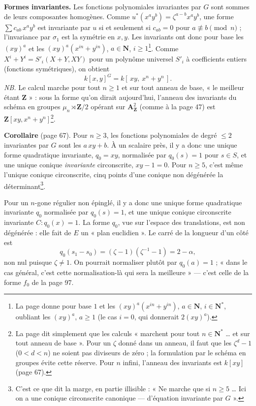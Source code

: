 \documentclass[11pt,a4paper]{article}
\begin{document}
\textbf{Formes invariantes.} Les fonctions polynomiales invariantes par $G$
sont sommes de leurs composantes homogènes. Comme $u^{*}(x^a y^b) =
\zeta^{a-b} x^a y^b$, une forme $\sum c_{ab}\, x^a y^b$ est invariante par
$u$ si et seulement si $c_{ab} = 0$ pour $a \not\equiv b \pmod n$ ;
l'invariance par $\sigma_1$ est la symétrie en $x, y$. Les invariants ont donc
pour base les $(xy)^a$ et les $(xy)^a (x^{in} + y^{in})$, $a \in \mathbf{N}$,
$i \geq 1$\footnote{La page donne pour base $1$ et les $(xy)^a(x^{in} +
y^{in})$, $a \in \mathbf{N}$, $i \in \mathbf{N}^{*}$, oubliant les $(xy)^a$,
$a \geq 1$ (le cas $i = 0$, qui donnerait $2(xy)^a$).}. Comme $X^i + Y^i =
S'_i(X + Y, XY)$ pour un polynôme universel $S'_i$ à coefficients entiers
(fonctions symétriques), on obtient
\[
  k[x, y]^{G} = k[\,xy,\ x^n + y^n\,] .
\]
\emph{NB.} Le calcul marche pour tout $n \geq 1$ et sur tout anneau de base,
« le meilleur étant $\mathbf{Z}$ » : sous la forme qu'on dirait aujourd'hui,
l'anneau des invariants du schéma en groupes $\mu_n \rtimes \mathbf{Z}/2$
opérant sur $\mathbf{A}^2_{\mathbf{Z}}$ (comme à la page 47) est
$\mathbf{Z}[xy, x^n + y^n]$\footnote{La page dit simplement que les calculs
« marchent pour tout $n \in \mathbf{N}^{*}$ \ldots{} et sur tout anneau de
base ». Pour un $\zeta$ donné dans un anneau, il faut que les $\zeta^d - 1$
($0 < d < n$) ne soient pas diviseurs de zéro ; la formulation par le schéma
en groupes évite cette réserve. Pour $n$ infini, l'anneau des invariants est
$k[xy]$ (page 67).}.

\textbf{Corollaire} (page 67). Pour $n \geq 3$, les fonctions polynomiales de
degré $\leq 2$ invariantes par $G$ sont les $a\,xy + b$. À un scalaire près,
il y a donc une unique forme quadratique invariante, $q_0 = xy$, normalisée
par $q_0(s) = 1$ pour $s \in S$, et une unique conique \emph{invariante}
circonscrite, $xy - 1 = 0$. Pour $n \geq 5$, c'est même l'unique conique
circonscrite, cinq points d'une conique non dégénérée la
déterminant\footnote{C'est ce que dit la marge, en partie illisible : « Ne
marche que si $n \geq 5$ \ldots{} Ici on a une conique circonscrite canonique
--- d'équation invariante par $G$ ».}.

Pour un $n$-gone régulier non épinglé, il y a donc une unique forme
quadratique invariante $q_0$ normalisée par $q_0(s) = 1$, et une unique
conique circonscrite invariante $C : q_0(x) = 1$. La forme $q_0$, vue sur
l'espace des translations, est non dégénérée : elle fait de $E$ un « plan
euclidien ». Le carré de la longueur d'un côté est
\[
  q_0(s_1 - s_0) = (\zeta - 1)(\zeta^{-1} - 1) = 2 - \alpha ,
\]
non nul puisque $\zeta \neq 1$. On pourrait normaliser plutôt par $q_0(a) =
1$ ; « dans le cas général, c'est cette normalisation-là qui sera la
meilleure » --- c'est celle de la forme $f_0$ de la page 97.
\end{document}
